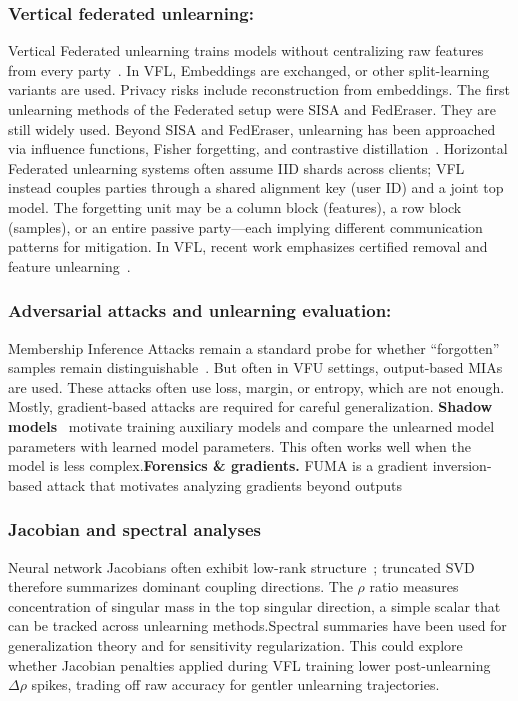 \documentclass[sigconf,nonacm]{acmart}
\begin{document}
\subsubsection{Vertical federated unlearning: }
Vertical Federated unlearning trains models without centralizing raw features from every party~\cite{yang2019federated}. In VFL, Embeddings are exchanged, or other split-learning variants are used. Privacy risks include reconstruction from embeddings. The first unlearning methods of the Federated setup were SISA and FedEraser. They are still widely used. Beyond SISA and FedEraser, unlearning has been approached via influence functions, Fisher forgetting, and contrastive distillation~\cite{bourtoule2021sisa,guo2019certified}. Horizontal Federated unlearning systems often assume IID shards across clients; VFL instead couples parties through a shared alignment key (user ID) and a joint top model. The forgetting unit may be a column block (features), a row block (samples), or an entire passive party---each implying different communication patterns for mitigation. In VFL, recent work emphasizes certified removal and feature unlearning~\cite{wang2025certified,varshney2025vfu}. 



\subsubsection{Adversarial attacks and unlearning evaluation: }
Membership Inference Attacks remain a standard probe for whether ``forgotten'' samples remain distinguishable~\cite{shokri2017mia,salem2018ml_leaks}. But often in VFU settings, output-based MIAs are used. These attacks often use loss, margin, or entropy, which are not enough. Mostly, gradient-based attacks are required for careful generalization. \textbf{Shadow models}~\cite{shokri2017mia} motivate training auxiliary models and compare the unlearned model parameters with learned model parameters. This often works well when the model is less complex.\textbf{Forensics \& gradients.} FUMA is a gradient inversion-based attack that motivates analyzing gradients beyond outputs~\cite{geiping2020inverting}

\subsubsection{Jacobian and spectral analyses}
Neural network Jacobians often exhibit low-rank structure~\cite{oymak2019jacobian}; truncated SVD therefore summarizes dominant coupling directions. The $\rho$ ratio measures concentration of singular mass in the top singular direction, a simple scalar that can be tracked across unlearning methods.Spectral summaries have been used for generalization theory and for sensitivity regularization. This could explore whether Jacobian penalties applied during VFL training lower post-unlearning $\Delta\rho$ spikes, trading off raw accuracy for gentler unlearning trajectories.
\end{document}

